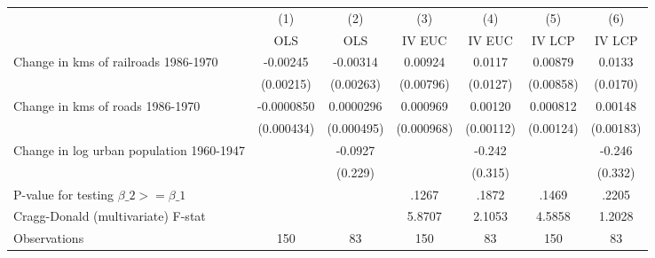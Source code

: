 {
\def\sym#1{\ifmmode^{#1}\else\(^{#1}\)\fi}
\begin{tabular}{l*{6}{c}}
\hline\hline
                &\multicolumn{1}{c}{(1)}&\multicolumn{1}{c}{(2)}&\multicolumn{1}{c}{(3)}&\multicolumn{1}{c}{(4)}&\multicolumn{1}{c}{(5)}&\multicolumn{1}{c}{(6)}\\
                &\multicolumn{1}{c}{OLS}&\multicolumn{1}{c}{OLS}&\multicolumn{1}{c}{IV EUC}&\multicolumn{1}{c}{IV EUC}&\multicolumn{1}{c}{IV LCP}&\multicolumn{1}{c}{IV LCP}\\
\hline
Change in kms of railroads 1986-1970& -0.00245         & -0.00314         &  0.00924         &   0.0117         &  0.00879         &   0.0133         \\
                &(0.00215)         &(0.00263)         &(0.00796)         & (0.0127)         &(0.00858)         & (0.0170)         \\
[1em]
Change in kms of roads 1986-1970&-0.0000850         &0.0000296         & 0.000969         &  0.00120         & 0.000812         &  0.00148         \\
                &(0.000434)         &(0.000495)         &(0.000968)         &(0.00112)         &(0.00124)         &(0.00183)         \\
[1em]
Change in log urban population 1960-1947&                  &  -0.0927         &                  &   -0.242         &                  &   -0.246         \\
                &                  &  (0.229)         &                  &  (0.315)         &                  &  (0.332)         \\
\hline
P-value for testing $\beta\_{2} >= \beta\_{1}$&                  &                  &    .1267         &    .1872         &    .1469         &    .2205         \\
Cragg-Donald (multivariate) F-stat&                  &                  &   5.8707         &   2.1053         &   4.5858         &   1.2028         \\
Observations    &      150         &       83         &      150         &       83         &      150         &       83         \\
\hline\hline
\end{tabular}
}
